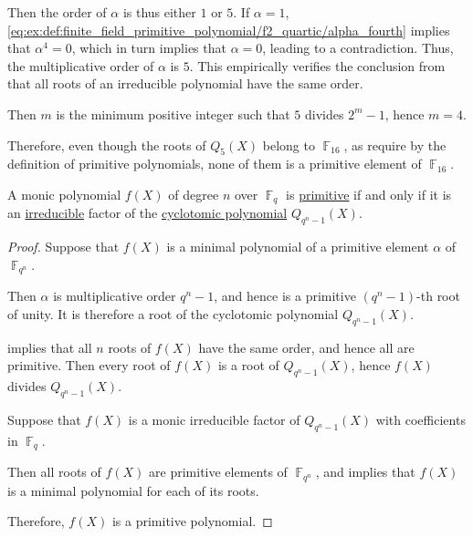 \begin{example}
\begin{thmenum}
    Then the order of \( \alpha \) is thus either \( 1 \) or \( 5 \). If \( \alpha = 1 \), \eqref{eq:ex:def:finite_field_primitive_polynomial/f2_quartic/alpha_fourth} implies that \( \alpha^4 = 0 \), which in turn implies that \( \alpha = 0 \), leading to a contradiction. Thus, the multiplicative order of \( \alpha \) is \( 5 \). This empirically verifies the conclusion from  that all roots of an irreducible polynomial have the same order.

    Then \( m \) is the minimum positive integer such that \( 5 \) divides \( 2^m - 1 \), hence \( m = 4 \).

    Therefore, even though the roots of \( Q_5(X) \) belong to \( \BbbF_{16} \), as require by the definition of primitive polynomials, none of them is a primitive element of \( \BbbF_{16} \).
  \end{thmenum}
\end{example}

\begin{proposition}\label{thm:primitive_polynomial_cyclotomic_factor}
  A monic polynomial \( f(X) \) of degree \( n \) over \( \BbbF_q \) is \hyperref[def:finite_field_primitive_polynomial]{primitive} if and only if it is an \hyperref[def:domain_divisibility/irreducible]{irreducible} factor of the \hyperref[def:cyclotomic_polynomial]{cyclotomic polynomial} \( Q_{q^n - 1}(X) \).
\end{proposition}
\begin{proof}
  \SufficiencySubProof Suppose that \( f(X) \) is a minimal polynomial of a primitive element \( \alpha \) of \( \BbbF_{q^n} \).

  Then \( \alpha \) is multiplicative order \( q^n - 1 \), and hence is a primitive \( (q^n - 1) \)-th root of unity. It is therefore a root of the cyclotomic polynomial \( Q_{q^n - 1}(X) \).

   implies that all \( n \) roots of \( f(X) \) have the same order, and hence all are primitive. Then every root of \( f(X) \) is a root of \( Q_{q^n - 1}(X) \), hence \( f(X) \) divides \( Q_{q^n - 1}(X) \).

  \NecessitySubProof Suppose that \( f(X) \) is a monic irreducible factor of \( Q_{q^n - 1}(X) \) with coefficients in \( \BbbF_q \).

  Then all roots of \( f(X) \) are primitive elements of \( \BbbF_{q^n} \), and  implies that \( f(X) \) is a minimal polynomial for each of its roots.

  Therefore, \( f(X) \) is a primitive polynomial.
\end{proof}
